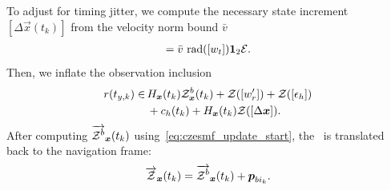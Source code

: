 \documentclass{ifacconf}
\begin{document}
To adjust for timing jitter, we compute the necessary state increment $[\Delta \vec{x}(t_k)]$ from the velocity norm bound $\bar{v}$
\begin{align}
  [\Delta \vec{x}] = \bar{v} \, \rad{[w_t]}
  \1_2\unitInterval.
\end{align}
Then, we inflate the observation inclusion
\begin{align}
  {r}(t_{y,k}) \in\,&
                           H_{\boldsymbol{x}}(t_k)
                           \mathcal{Z}^b_{\boldsymbol{x}} (t_k)
                           + \mathcal{Z}([w'_r] )
                           + \mathcal{Z}([\epsilon_h])\nonumber\\
                    &       + c_h(t_k)
                           + H_{\boldsymbol{x}}(t_k) \mathcal{Z}([\Delta \boldsymbol{x}]).
\end{align}
After computing $\overrightarrow{\mathcal{Z}^b}_{\boldsymbol{x}}(t_k)$ using~\eqref{eq:czesmf_update_start}, the \cz\ is translated back to the navigation frame:
\begin{align}
  \overrightarrow{\mathcal{Z}}_{\boldsymbol{x}} (t_k) = \overrightarrow{{\mathcal{Z}}^b}_{\boldsymbol{x}} (t_k) + \boldsymbol{p}_{b i_k}.
\end{align}

\end{document}
